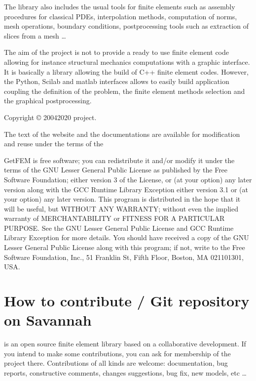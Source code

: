 \documentclass[a4paper,11pt,english]{sphinxmanual}
\begin{document}
The library also includes the usual tools for finite elements such as assembly
procedures for classical PDEs, interpolation methods, computation of norms,
mesh operations, boundary conditions, post\sphinxhyphen{}processing tools such as
extraction of slices from a mesh …

The aim of the  project is not to provide a ready to use
finite element code allowing for instance structural mechanics
computations with a graphic interface. It is basically a library
allowing the build of C++  finite element codes.
However, the Python, Scilab and matlab interfaces allows to easily build application
coupling the definition of the problem, the finite element methods
selection and the graphical post\sphinxhyphen{}processing.

Copyright © 2004\sphinxhyphen{}2020  project.

The text of the  website and the documentations are available for modification and reuse under the terms of the 

GetFEM  is  free software;  you  can  redistribute  it  and/or modify it
under  the  terms  of the  GNU  Lesser General Public License as published
by  the  Free Software Foundation;  either version 3 of the License,  or
(at your option) any later version along with the GCC Runtime Library
Exception either version 3.1 or (at your option) any later version.
This program  is  distributed  in  the  hope  that it will be useful,  but
WITHOUT ANY WARRANTY; without even the implied warranty of MERCHANTABILITY
or  FITNESS  FOR  A PARTICULAR PURPOSE.  See the GNU Lesser General Public
License and GCC Runtime Library Exception for more details.
You  should  have received a copy of the GNU Lesser General Public License
along  with  this program;  if not, write to the Free Software Foundation,
Inc., 51 Franklin St, Fifth Floor, Boston, MA  02110\sphinxhyphen{}1301, USA.


\chapter{How to contribute / Git repository on Savannah}
\label{\detokenize{project/contribute:how-to-contribute-git-repository-on-savannah}}\label{\detokenize{project/contribute:dp-contribute}}\label{\detokenize{project/contribute::doc}}
 is an  open source finite element library based on a collaborative development. If you intend to make some contributions, you can ask for membership of the project there. Contributions of all kinds are welcome: documentation, bug reports, constructive comments, changes suggestions, bug fix, new models, etc …
\end{document}
